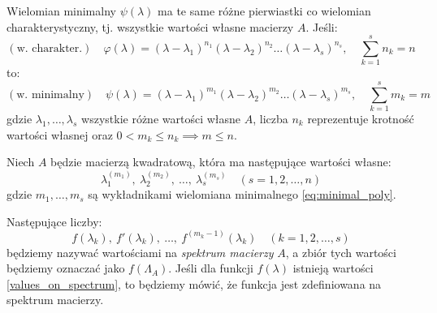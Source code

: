 Wielomian minimalny $\psi(\lambda)$ ma te same różne pierwiastki co wielomian charakterystyczny, tj. wszystkie wartości własne macierzy $A$.
Jeśli:
\begin{equation}
   (\text{w. charakter.}) \quad 
   \varphi(\lambda) = (\lambda - \lambda_1)^{n_1}(\lambda - \lambda_2)^{n_2}\ldots(\lambda - \lambda_s)^{n_s}, \quad \sum_{k=1}^{s}{n_k} = n 
\end{equation}
to:
\begin{equation}\label{eq:minimal_poly}
    (\text{w. minimalny}) \quad 
    \psi(\lambda) = (\lambda - \lambda_1)^{m_1}(\lambda - \lambda_2)^{m_2}\ldots(\lambda - \lambda_s)^{m_s}, \quad \sum_{k=1}^{s}{m_k} = m
\end{equation}
gdzie $\lambda_1, \ldots, \lambda_s$ wszystkie różne wartości własne $A$, liczba $n_k$ reprezentuje krotność wartości własnej oraz $0 < m_k \le n_k \implies m \le n$.

\begin{definition}\label{def:function_on_spectrum}
    Niech $A$ będzie macierzą kwadratową, która ma następujące wartości własne:
    $$ \lambda^{(m_1)}_1, \ \lambda^{(m_2)}_2, \ \ldots, \ \lambda^{(m_s)}_s \quad (s = 1, 2, \ldots, n) $$
    gdzie $m_1, \ldots, m_s$ są wykładnikami wielomiana minimalnego \eqref{eq:minimal_poly}.

    Następujące liczby:
    \begin{equation}\label{values_on_spectrum}
        f(\lambda_{k}), \ f'(\lambda_{k}), \ \ldots, \ f^{(m_k - 1)}(\lambda_{k}) \quad (k = 1, 2, \ldots, s)
    \end{equation}
    będziemy nazywać wartościami na \textit{spektrum macierzy} $A$, a zbiór tych wartości będziemy oznaczać jako $f(\Lambda_{A})$. Jeśli dla funkcji $f(\lambda)$ istnieją wartości \eqref{values_on_spectrum}, to będziemy mówić, że funkcja jest zdefiniowana na spektrum macierzy.
\end{definition}

